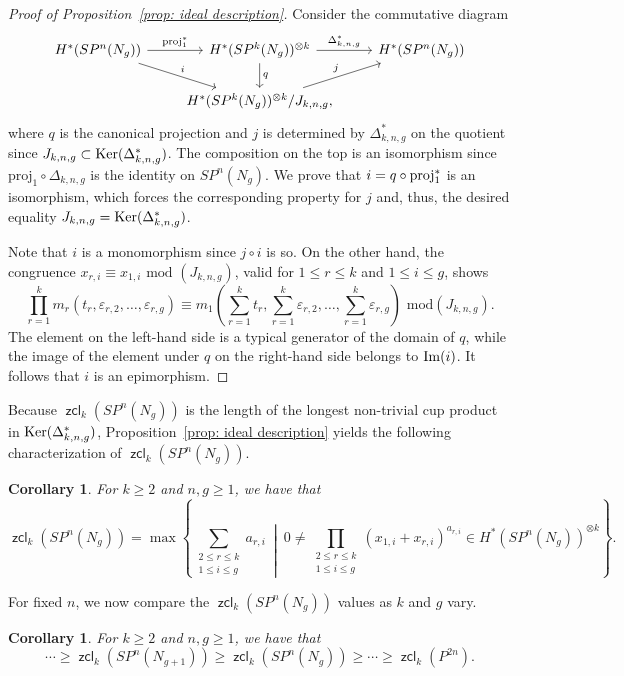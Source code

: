 \documentclass[amscd,amssymb,verbatim,10pt]{amsart}
\numberwithin{equation}{section}
\theoremstyle{plain}
\newtheorem{corollary}[thm]{Corollary}
\theoremstyle{definition}
\DeclareMathOperator{\zcl}{{\mathsf{zcl}}}
\DeclareMathOperator{\proj}{{\textup{proj}}}
\DeclareMathOperator{\Ker}{{\rm Ker}}
\def\Im{\protect\operatorname{Im}}
\begin{document}
\begin{proof}[Proof of Proposition~\ref{prop: ideal description}]
Consider the commutative diagram
\[
\begin{tikzcd}
H^*(SP^n(N_g)) \arrow{r}{\proj_1^*} \arrow{dr}{i}
&
H^*(SP^k(N_g))^{\otimes k}   \arrow{r}{\Delta^*_{k,n,g}}  \arrow{d}{q}
&
H^*(SP^n(N_g))
\\
&
H^*(SP^k(N_g))^{\otimes k}/J_{k,n,g}, \arrow{ur}{j}
&
\end{tikzcd}
\]
where $q$ is the canonical projection and $j$ is determined by $\Delta_{k,n,g}^*$ on the quotient since $J_{k,n,g}\subset\Ker(\Delta_{k,n,g}^*)$. The composition on the top is an isomorphism since $\text{proj}_1 \circ \Delta_{k,n,g}$ is the identity on $SP^n(N_g)$. We prove that $i=q\circ \proj_1^*$ is an isomorphism, which forces the corresponding property for $j$ and, thus, the desired equality $J_{k,n,g}=\Ker(\Delta_{k,n,g}^*)$.

Note that $i$ is a monomorphism since $j\circ i$ is so. On the other hand, the congruence $x_{r,i}\equiv x_{1,i}\text{ mod }(J_{k,n,g})$, valid for $1\le r\le k$ and $1\le i \le g$, shows
\[
\prod_{r=1}^k
m_r\left( t_r,\varepsilon_{r,2},\ldots,\varepsilon_{r,g}\right) \equiv m_1\left(\sum_{r=1}^k t_r,\sum_{r=1}^k \varepsilon_{r,2},\ldots,\sum_{r=1}^k \varepsilon_{r,g}\right) \text{ mod}\left(J_{k,n,g}\right).
\]
The element on the left-hand side is a typical generator of the domain of $q$, while the image of the element under $q$ on the right-hand side belongs to $\Im(i)$. It follows that $i$ is an epimorphism.
\end{proof}

Because $\zcl_k(SP^n(N_g))$ is the length of the longest non-trivial cup product in $\Ker(\Delta^*_{k,n,g})$, Proposition~\ref{prop: ideal description} yields the following characterization of $\zcl_k(SP^n(N_g))$.

\begin{corollary}\label{cor: zcl simplified}
For $k\ge 2$ and $n,g\ge 1$, we have that
\[
\zcl_k(SP^n(N_g))=\max\left\{\sum_{\substack{2\le r\le k \\ 1\le i \le g}}a_{r,i} \ \middle| \ 0\ne\prod_{\substack{2\le r\le k \\ 1\le i \le g}}\left(x_{1,i}+x_{r,i}\right)^{a_{r,i}}\in H^*(SP^n(N_g))^{\otimes k} \right\}.
\]
\end{corollary}

For fixed $n$, we now compare the $\zcl_k(SP^n(N_g))$ values as $k$ and $g$ vary.

\begin{corollary}\label{cor: zcl with g changing}
For $k\ge 2$ and $n,g\ge 1$, we have that
\[
\cdots\ge \zcl_k(SP^n(N_{g+1}))\ge \zcl_k(SP^n(N_{g})) \ge \cdots\ge\zcl_k(P^{2n}).
\]
\end{corollary}
\end{document}
